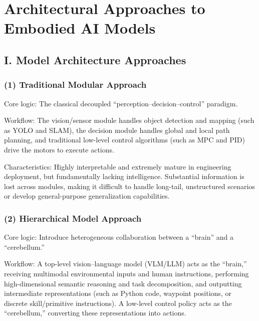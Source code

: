 \setcounter{section}{0}

\hypertarget{architectural-approaches-to-embodied-ai-models}{%
\section{Architectural Approaches to Embodied AI Models}\label{architectural-approaches-to-embodied-ai-models}}

\hypertarget{i.-model-architecture-approaches}{%
\subsection{I. Model Architecture Approaches}\label{i.-model-architecture-approaches}}

\hypertarget{traditional-modular-approach}{%
\subsubsection{(1) Traditional Modular Approach}\label{traditional-modular-approach}}

Core logic: The classical decoupled ``perception--decision--control'' paradigm.

Workflow: The vision/sensor module handles object detection and mapping (such as YOLO and SLAM), the decision module handles global and local path planning, and traditional low-level control algorithms (such as MPC and PID) drive the motors to execute actions.

Characteristics: Highly interpretable and extremely mature in engineering deployment, but fundamentally lacking intelligence. Substantial information is lost across modules, making it difficult to handle long-tail, unstructured scenarios or develop general-purpose generalization capabilities.

\hypertarget{hierarchical-model-approach}{%
\subsubsection{(2) Hierarchical Model Approach}\label{hierarchical-model-approach}}

Core logic: Introduce heterogeneous collaboration between a ``brain'' and a ``cerebellum.''

Workflow: A top-level vision--language model (VLM/LLM) acts as the ``brain,'' receiving multimodal environmental inputs and human instructions, performing high-dimensional semantic reasoning and task decomposition, and outputting intermediate representations (such as Python code, waypoint positions, or discrete skill/primitive instructions). A low-level control policy acts as the ``cerebellum,'' converting these representations into actions.

